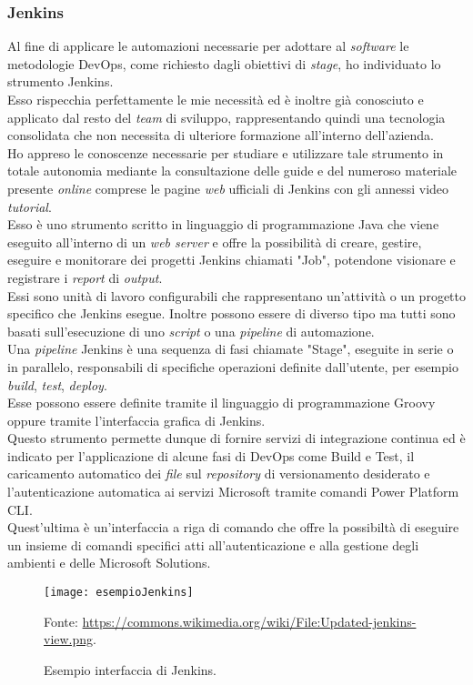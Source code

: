 \subsubsection*{Jenkins}
Al fine di applicare le automazioni necessarie per adottare al \emph{software} le metodologie \gls{DevOps}, come richiesto dagli obiettivi di \emph{stage}, ho individuato lo strumento Jenkins.\\
Esso rispecchia perfettamente le mie necessità ed è inoltre già conosciuto e applicato dal resto del \emph{team} di sviluppo, rappresentando quindi una tecnologia consolidata che non necessita di ulteriore formazione all'interno dell'azienda.\\
Ho appreso le conoscenze necessarie per studiare e utilizzare tale strumento in totale autonomia mediante la consultazione delle guide e del numeroso materiale presente \emph{online} comprese le pagine \emph{web} ufficiali di Jenkins con gli annessi video \emph{tutorial}.\\
Esso è uno strumento scritto in linguaggio di programmazione Java che viene eseguito all'interno di un \emph{web server} e offre la possibilità di creare, gestire, eseguire e monitorare dei progetti Jenkins chiamati "Job", potendone visionare e registrare i \emph{report} di \emph{output}.\\
Essi sono unità di lavoro configurabili che rappresentano un'attività o un progetto specifico che Jenkins esegue. Inoltre possono essere di diverso tipo ma tutti sono basati sull'esecuzione di uno \emph{script} o una \emph{pipeline} di automazione.\\
Una \emph{pipeline} Jenkins è una sequenza di fasi chiamate "Stage", eseguite in serie o in parallelo, responsabili di specifiche operazioni definite dall'utente, per esempio \emph{build}, \emph{test}, \emph{deploy}.\\
Esse possono essere definite tramite il linguaggio di programmazione Groovy oppure tramite l'interfaccia grafica di Jenkins.\\
Questo strumento permette dunque di fornire servizi di integrazione continua ed è indicato per l'applicazione di alcune fasi di \gls{DevOps} come Build e Test, il caricamento automatico dei \emph{file} sul \emph{repository} di versionamento desiderato e l'autenticazione automatica ai servizi Microsoft tramite comandi Power Platform CLI.\\
Quest'ultima è un'interfaccia a riga di comando che offre la possibiltà di eseguire un insieme di comandi specifici atti all'autenticazione e alla gestione degli ambienti e delle Microsoft Solutions.\\
\begin{figure}[htbp] 
    \centering 
    \texttt{[image: esempioJenkins]} 
    \caption{Esempio interfaccia di Jenkins.}
    \label{fig:esempioJenkins}
    \vspace{1mm}
    Fonte: \url{https://commons.wikimedia.org/wiki/File:Updated-jenkins-view.png}.
\end{figure}

